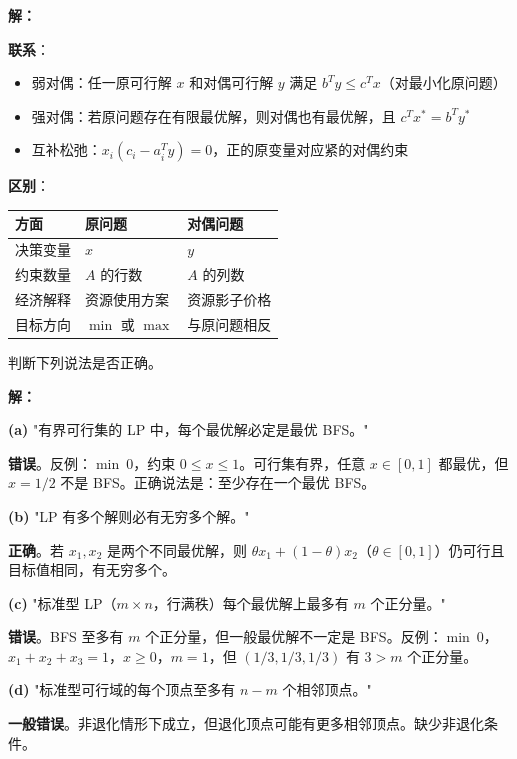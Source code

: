\begin{example}[原问题与对偶问题的联系与区别]\label{ex:primal-dual-comparison}

\textbf{解：}

\textbf{联系}：
\begin{itemize}[itemsep=0.2em]
    \item 弱对偶：任一原可行解 $x$ 和对偶可行解 $y$ 满足 $b^T y \leq c^T x$（对最小化原问题）
    \item 强对偶：若原问题存在有限最优解，则对偶也有最优解，且 $c^T x^* = b^T y^*$
    \item 互补松弛：$x_i(c_i - a_i^T y) = 0$，正的原变量对应紧的对偶约束
\end{itemize}

\textbf{区别}：
\begin{center}
\begin{tabular}{@{}lll@{}}
\toprule
方面 & 原问题 & 对偶问题 \\
\midrule
决策变量 & $x$ & $y$ \\
约束数量 & $A$ 的行数 & $A$ 的列数 \\
经济解释 & 资源使用方案 & 资源影子价格 \\
目标方向 & $\min$ 或 $\max$ & 与原问题相反 \\
\bottomrule
\end{tabular}
\end{center}
\end{example}

\begin{example}[线性规划基本概念判断]\label{ex:lp-true-false}
判断下列说法是否正确。

\textbf{解：}

\textbf{(a)} "有界可行集的 LP 中，每个最优解必定是最优 BFS。"

\textbf{错误}。反例：$\min\ 0$，约束 $0 \leq x \leq 1$。可行集有界，任意 $x \in [0, 1]$ 都最优，但 $x = 1/2$ 不是 BFS。正确说法是：至少存在一个最优 BFS。

\textbf{(b)} "LP 有多个解则必有无穷多个解。"

\textbf{正确}。若 $x_1, x_2$ 是两个不同最优解，则 $\theta x_1 + (1-\theta)x_2$（$\theta \in [0,1]$）仍可行且目标值相同，有无穷多个。

\textbf{(c)} "标准型 LP（$m \times n$，行满秩）每个最优解上最多有 $m$ 个正分量。"

\textbf{错误}。BFS 至多有 $m$ 个正分量，但一般最优解不一定是 BFS。反例：$\min\ 0$，$x_1 + x_2 + x_3 = 1$，$x \geq 0$，$m = 1$，但 $(1/3, 1/3, 1/3)$ 有 $3 > m$ 个正分量。

\textbf{(d)} "标准型可行域的每个顶点至多有 $n - m$ 个相邻顶点。"

\textbf{一般错误}。非退化情形下成立，但退化顶点可能有更多相邻顶点。缺少非退化条件。
\end{example}

